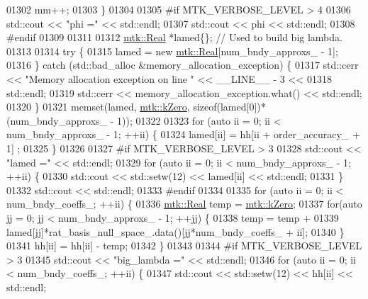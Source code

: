 \begin{DoxyCode}
{{01302       mm++;
01303     \}
01304 
01305 \textcolor{preprocessor}{    #if MTK\_VERBOSE\_LEVEL > 4}
01306     std::cout << \textcolor{stringliteral}{"phi ="} << std::endl;
01307     std::cout << phi << std::endl;
01308 \textcolor{preprocessor}{    #endif}
01309 
01311 
01312     \hyperlink{group__c01-roots_gac080bbbf5cbb5502c9f00405f894857d}{mtk::Real} *lamed\{\};  \textcolor{comment}{// Used to build big lambda.}
01313 
01314     \textcolor{keywordflow}{try} \{
01315       lamed = \textcolor{keyword}{new} \hyperlink{group__c01-roots_gac080bbbf5cbb5502c9f00405f894857d}{mtk::Real}[num\_bndy\_approxs\_ - 1];
01316     \} \textcolor{keywordflow}{catch} (std::bad\_alloc &memory\_allocation\_exception) \{
01317       std::cerr << \textcolor{stringliteral}{"Memory allocation exception on line "} << \_\_LINE\_\_ - 3 <<
01318         std::endl;
01319       std::cerr << memory\_allocation\_exception.what() << std::endl;
01320     \}
01321     memset(lamed, \hyperlink{group__c01-roots_ga59a451a5fae30d59649bcda274fea271}{mtk::kZero}, \textcolor{keyword}{sizeof}(lamed[0])*(num\_bndy\_approxs\_ - 1));
01322 
01323     \textcolor{keywordflow}{for} (\textcolor{keyword}{auto} ii = 0; ii < num\_bndy\_approxs\_ - 1; ++ii) \{
01324       lamed[ii] = hh[ii + order\_accuracy\_ + 1] ;
01325     \}
01326 
01327 \textcolor{preprocessor}{    #if MTK\_VERBOSE\_LEVEL > 3}
01328     std::cout << \textcolor{stringliteral}{"lamed ="} << std::endl;
01329     \textcolor{keywordflow}{for} (\textcolor{keyword}{auto} ii = 0; ii < num\_bndy\_approxs\_ - 1; ++ii) \{
01330       std::cout << std::setw(12) << lamed[ii] << std::endl;
01331     \}
01332     std::cout << std::endl;
01333 \textcolor{preprocessor}{    #endif}
01334 
01335     \textcolor{keywordflow}{for} (\textcolor{keyword}{auto} ii = 0; ii < num\_bndy\_coeffs\_; ++ii) \{
01336       \hyperlink{group__c01-roots_gac080bbbf5cbb5502c9f00405f894857d}{mtk::Real} temp = \hyperlink{group__c01-roots_ga59a451a5fae30d59649bcda274fea271}{mtk::kZero};
01337       \textcolor{keywordflow}{for}(\textcolor{keyword}{auto} jj = 0; jj < num\_bndy\_approxs\_ - 1; ++jj) \{
01338         temp = temp +
01339           lamed[jj]*rat\_basis\_null\_space\_.data()[jj*num\_bndy\_coeffs\_ + ii];
01340       \}
01341       hh[ii] = hh[ii] - temp;
01342     \}
01343 
01344 \textcolor{preprocessor}{    #if MTK\_VERBOSE\_LEVEL > 3}
01345     std::cout << \textcolor{stringliteral}{"big\_lambda ="} << std::endl;
01346     \textcolor{keywordflow}{for} (\textcolor{keyword}{auto} ii = 0; ii < num\_bndy\_coeffs\_; ++ii) \{
01347       std::cout << std::setw(12) << hh[ii] << std::endl;
}}
\end{DoxyCode}
